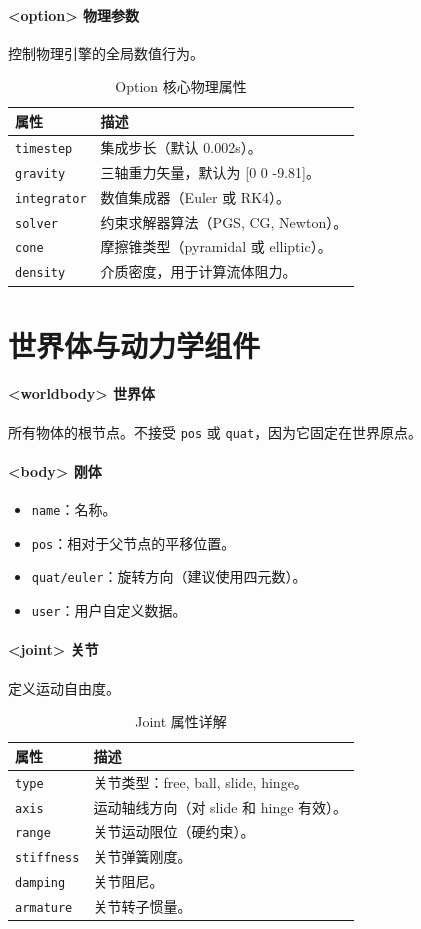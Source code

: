 \documentclass[11pt,a4paper]{book}
\begin{document}
\paragraph{<option> 物理参数}
控制物理引擎的全局数值行为。
\begin{longtable}{lp{12cm}}
\caption{Option 核心物理属性} \\
\toprule
\textbf{属性} & \textbf{描述} \\ \midrule
\texttt{timestep} & 集成步长（默认 0.002s）。 \\
\texttt{gravity} & 三轴重力矢量，默认为 [0 0 -9.81]。 \\
\texttt{integrator} & 数值集成器（Euler 或 RK4）。 \\
\texttt{solver} & 约束求解器算法（PGS, CG, Newton）。 \\
\texttt{cone} & 摩擦锥类型（pyramidal 或 elliptic）。 \\
\texttt{density} & 介质密度，用于计算流体阻力。 \\
\bottomrule
\end{longtable}

\section{世界体与动力学组件}

\paragraph{<worldbody> 世界体}
所有物体的根节点。不接受 \texttt{pos} 或 \texttt{quat}，因为它固定在世界原点。

\paragraph{<body> 刚体}
\begin{itemize}
    \item \texttt{name}：名称。
    \item \texttt{pos}：相对于父节点的平移位置。
    \item \texttt{quat/euler}：旋转方向（建议使用四元数）。
    \item \texttt{user}：用户自定义数据。
\end{itemize}

\paragraph{<joint> 关节}
定义运动自由度。
\begin{longtable}{lp{12cm}}
\caption{Joint 属性详解} \\
\toprule
\textbf{属性} & \textbf{描述} \\ \midrule
\texttt{type} & 关节类型：free, ball, slide, hinge。 \\
\texttt{axis} & 运动轴线方向（对 slide 和 hinge 有效）。 \\
\texttt{range} & 关节运动限位（硬约束）。 \\
\texttt{stiffness} & 关节弹簧刚度。 \\
\texttt{damping} & 关节阻尼。 \\
\texttt{armature} & 关节转子惯量。 \\
\bottomrule
\end{longtable}
\end{document}
